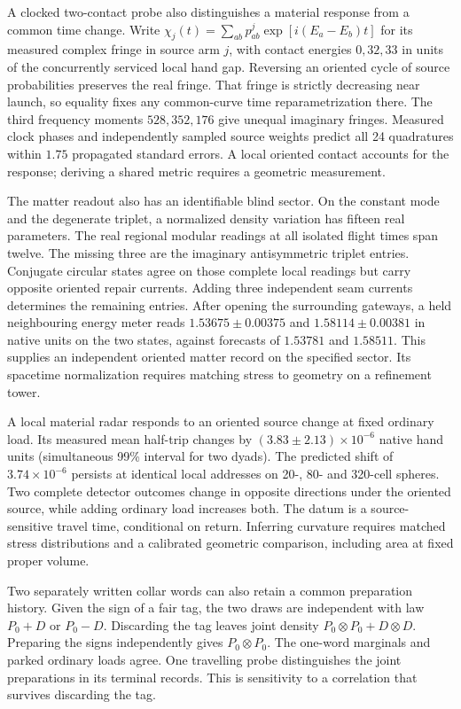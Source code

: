 \documentclass[11pt]{article}
\begin{document}
A clocked two-contact probe also distinguishes a material response from
a common time change. Write $\chi_j(t)=\sum_{ab}p^j_{ab}
\exp[i(E_a-E_b)t]$ for its measured complex fringe in source arm $j$,
with contact energies $0,32,33$ in units of the concurrently serviced
local hand gap. Reversing an oriented cycle of source probabilities
preserves the real fringe. That fringe is strictly decreasing near
launch, so equality fixes any common-curve time reparametrization
there. The third frequency moments $528,352,176$ give unequal imaginary
fringes. Measured clock phases and independently sampled source
weights predict all 24 quadratures within $1.75$ propagated standard
errors. A local oriented contact accounts for the response; deriving a
shared metric requires a geometric measurement.

The matter readout also has an identifiable blind sector. On the constant
mode and the degenerate triplet, a normalized density variation has fifteen
real parameters. The real regional modular readings at all isolated flight
times span twelve. The missing three are the imaginary antisymmetric
triplet entries. Conjugate circular states agree on those complete local
readings but carry opposite oriented repair currents. Adding three
independent seam currents determines the remaining entries. After opening
the surrounding gateways, a held neighbouring energy meter reads
$1.53675\pm0.00375$ and $1.58114\pm0.00381$ in native units on the
two states, against forecasts of $1.53781$ and $1.58511$.
This supplies an independent oriented matter record on the specified
sector. Its spacetime normalization requires matching stress to
geometry on a refinement tower.

A local material radar responds to an oriented source change at fixed
ordinary load. Its measured mean half-trip changes by
$(3.83\pm2.13)\times10^{-6}$ native hand units (simultaneous 99\%
interval for two dyads). The predicted shift of $3.74\times10^{-6}$
persists at identical local addresses on 20-, 80- and 320-cell
spheres. Two complete detector outcomes change in opposite directions
under the oriented source, while adding ordinary load increases both.
The datum is a source-sensitive travel time, conditional on return.
Inferring curvature requires matched stress distributions and a
calibrated geometric comparison, including area at fixed proper volume.

Two separately written collar words can also retain a common preparation
history. Given the sign of a fair tag, the two draws are independent
with law $P_0+D$ or $P_0-D$. Discarding the tag leaves joint density
$P_0\otimes P_0+D\otimes D$. Preparing the signs independently gives
$P_0\otimes P_0$. The one-word marginals and parked ordinary loads agree.
One travelling probe distinguishes the joint preparations in its terminal
records. This is sensitivity to a correlation that survives discarding
the tag.
\end{document}
